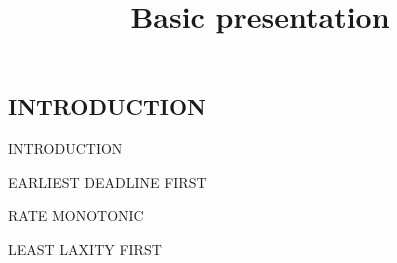 \documentclass{beamer}
\title{Basic presentation}
\begin{document}
\begin{frame}
\titlepage
\end{frame}
\begin{frame}
\section{INTRODUCTION}
INTRODUCTION
\end{frame}
\begin{frame}
EARLIEST DEADLINE FIRST
\begin{table}[]
\end{table}
\end{frame}
\begin{frame}
RATE MONOTONIC
\begin{table}[]
\end{table}
\end{frame}
\begin{frame}
LEAST LAXITY FIRST
\begin{table}[]
\end{table}
\end{frame}
\end{document}

